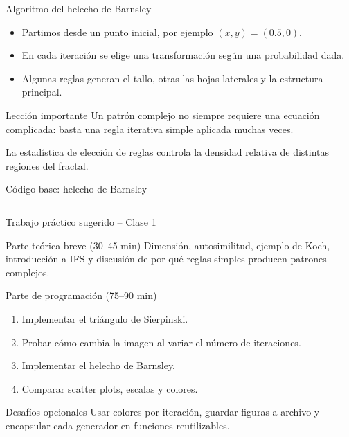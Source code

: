 \begin{frame}{Algoritmo del helecho de Barnsley}
\small
\begin{itemize}
    \item Partimos desde un punto inicial, por ejemplo $(x,y)=(0.5,0)$.
    \item En cada iteración se elige una transformación según una probabilidad dada.
    \item Algunas reglas generan el tallo, otras las hojas laterales y la estructura principal.
\end{itemize}

\vspace{0.2cm}
\begin{block}{Lección importante}
Un patrón complejo no siempre requiere una ecuación complicada: basta una regla iterativa simple aplicada muchas veces.
\end{block}

\vspace{0.1cm}
\begin{center}
\small La estadística de elección de reglas controla la densidad relativa de distintas regiones del fractal.
\end{center}
\end{frame}

\begin{frame}[fragile]{Código base: helecho de Barnsley}
\inputminted[firstline=1,lastline=21]{python}{fern.py}
\end{frame}

\begin{frame}{Trabajo práctico sugerido -- Clase 1}
\begin{block}{Parte teórica breve (30--45 min)}
Dimensión, autosimilitud, ejemplo de Koch, introducción a IFS y discusión de por qué reglas simples producen patrones complejos.
\end{block}

\begin{block}{Parte de programación (75--90 min)}
\begin{enumerate}
    \item Implementar el triángulo de Sierpinski.
    \item Probar cómo cambia la imagen al variar el número de iteraciones.
    \item Implementar el helecho de Barnsley.
    \item Comparar scatter plots, escalas y colores.
\end{enumerate}
\end{block}

\begin{alertblock}{Desafíos opcionales}
Usar colores por iteración, guardar figuras a archivo y encapsular cada generador en funciones reutilizables.
\end{alertblock}
\end{frame}

